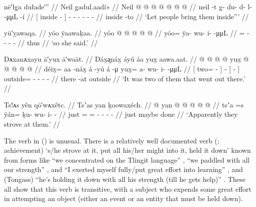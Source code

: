 \ex\label{ex:92-198-bring-them-in}%
%
\begingl
	\glpreamble	nē′łg̣a dułade′” //
	\glpreamble	Neil g̱adul.aadí\!» //
	\gla	{} Neil @ {} {}  @ {} @ {} @ {} @ {} @ {} @ {} //
	\glb	{} neil -t {} {} g̱- du- d- l-  -μμL -í //
	\glc	{}[ inside - {}]
		\· - - - -  - - //
	\gld	{} inside -to {}  {} {} {} {} {} {}  //
	\glft	‘Let people bring them inside”’
		//
\endgl
\xe

\ex\label{ex:92-199-she-said}%
%
\begingl
	\glpreamble	yū′ỵawaqa. //
	\glpreamble	yóo ÿaawaḵaa. //
	\gla	yóo @  @ {} @ {} @ {} @ {} //
	\glb	yóo= ÿa- wu- i-  -μμL //
	\glc	{}= - - -  - //
	\gld	thus  //
	\glft	‘so she said.’
		//
\endgl
\xe

\ex\label{ex:92-200-two-went-out-there}%
%
\begingl
	\glpreamble	Dᴀxanᴀxayu ā′yux ā′waāt. //
	\glpreamble	Dáx̱a̬náx̱ áyú áa yux̱ aawa.aat. //
	\gla	{}  @ {} @ {} {}  @ {}
		{}  @ {} {} yux̱ @  @ {} @ {} @ {} @ {} //
	\glb	{} déix̱= aa -náx̱ {} á -yú
		{} á -μ {} yux̱= a- wu- i-  -μμL //
	\glc	{}[ two=  - {}]  -
		{}[  - {}]
		outside= - - -  - //
	\gld	{}  {} {} {}  {}
		{} there -at {} outside  {} {} {} {} //
	\glft	‘It was two of them that went out there.’
		//
\endgl
\xe

\ex\label{ex:92-201-strive-at-them}%
%
\begingl
	\glpreamble	Ts!ᴀs yên qō′wᴀxêtc. //
	\glpreamble	Tsʼas yan ḵoowaxéch. //
	\gla	{} @ {} yan @  @ {} @ {} @ {} @ {} //
	\glb	tsʼa =s ÿán= ḵu- wu- i-  - //
	\glc	just = = - - -  - //
	\gld	just \•maybe done  //
	\glft	‘Apparently they strove at them.’
		//
\endgl
\xe

The verb  in (\lastx) is unusual.
There is a relatively well documented verb  (; achievement) ‘s/he strove at it, put all his/her might into it, held it down’ known from forms like  “we concentrated on the Tlingit language” \parencite[54.594]{story-naish:1973},  “we paddled with all our strength” \parencite[216.3030]{story-naish:1973}, and  “I exerted myself fully/put great effort into learning” \parencite[216.3031]{story-naish:1973}, and  (Tongass) “he’s holding it down with all his strength (till he gets help)” \parencite[f03/88]{leer:1973}.
These all show that this verb is transitive, with a subject who expends some great effort in attempting an object (either an event or an entity that must be held down).

